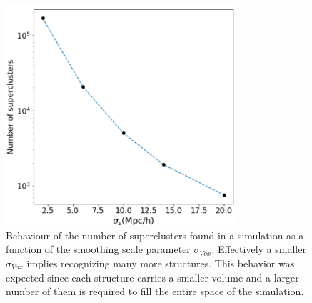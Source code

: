 \documentclass[usenatbib]{mnras}
\begin{document}
\begin{figure}
    \centering
    \includegraphics[width=240pt]{num_superclusters.pdf}
    \caption{Behaviour of the number of superclusters found in a
      simulation as a function of the smoothing scale parameter
      $\sigma_{Vox}$. Effectively a smaller $\sigma_{Vox}$ implies
      recognizing many more structures. This behavior was expected since each structure carries a smaller volume and a larger number of them is required to fill
      the entire space of the simulation.} 
    \label{fig:Nclusters}
\end{figure}
\end{document}
